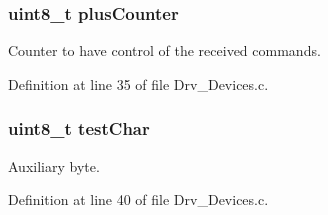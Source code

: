 \subsubsection[{\texorpdfstring{plus\+Counter}{plusCounter}}]{\setlength{\rightskip}{0pt plus 5cm}uint8\+\_\+t plus\+Counter}\hypertarget{group__Devices__Library_gac011c12f1d5ab04cb87b6edaec1d24ad}{}\label{group__Devices__Library_gac011c12f1d5ab04cb87b6edaec1d24ad}


Counter to have control of the received commands. 



Definition at line 35 of file Drv\+\_\+\+Devices.\+c.

\subsubsection[{\texorpdfstring{test\+Char}{testChar}}]{\setlength{\rightskip}{0pt plus 5cm}uint8\+\_\+t test\+Char}\hypertarget{group__Devices__Library_gae004df3f2b77e4d58eee171d2f76da40}{}\label{group__Devices__Library_gae004df3f2b77e4d58eee171d2f76da40}


Auxiliary byte. 



Definition at line 40 of file Drv\+\_\+\+Devices.\+c.

